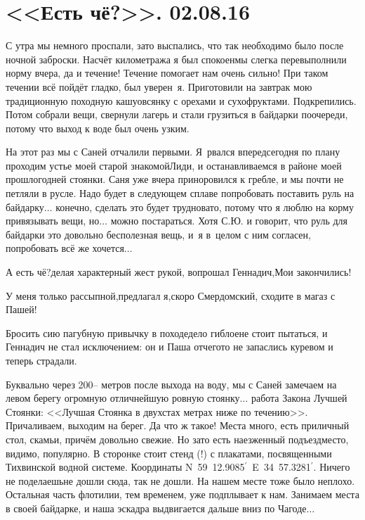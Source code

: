 \chapter{<<Есть чё?>>. 02.08.16} 

С утра мы немного проспали, зато выспались, что так необходимо было после ночной заброски. Насчёт километража я был спокоен\mdash мы слегка перевыполнили норму вчера, да и течение! Течение помогает нам очень сильно! При таком течении всё пойдёт гладко, был уверен~я. Приготовили на завтрак мою традиционную походную кашу\mdash овсянку с орехами и сухофруктами. Подкрепились. Потом собрали вещи, свернули лагерь и стали грузиться в байдарки по\sdash очереди, потому что выход к воде был очень узким. 

На этот раз мы с Саней отчалили первыми. Я~рвался вперед\mdash  сегодня по плану проходим устье моей старой знакомой\mdash  Лиди, и останавливаемся в районе моей прошлогодней стоянки. Саня уже вчера приноровился к гребле, и мы почти не петляли в русле. Надо будет в следующем сплаве попробовать поставить руль на байдарку$\ldots$ конечно, сделать это будет трудновато, потому что я люблю на корму привязывать вещи, но$\ldots$ можно постараться. Хотя С.Ю. и говорит, что руль для байдарки это довольно бесполезная вещь, и~я в~целом с ним согласен, попробовать всё же хочется$\ldots$ 

\diagdash А есть чё?\mdash делая характерный жест рукой, вопрошал Геннадич,\mdash Мои закончились!

\diagdash У меня только рассыпной,\mdash предлагал я,\mdash скоро Смердомский, сходите в магаз с Пашей!

Бросить сию пагубную привычку в походе\mdash дело гиблое\mdash не стоит пытаться, и Геннадич не стал исключением: он и Паша отчего\sdash то не запаслись куревом и теперь страдали.

Буквально через 200\thinspace\nobreakdash-- метров после выхода на воду, мы с Саней замечаем на левом берегу огромную отличнейшую ровную стоянку$\ldots$  работа Закона Лучшей Стоянки: <<Лучшая Стоянка в двухстах метрах ниже по течению>>. Причаливаем, выходим на берег. Да что ж такое! Места много, есть приличный стол, скамьи, причём довольно свежие. Но зато есть наезженный подъезд\mdash  место, видимо, популярно. В сторонке стоит стенд (!) с плакатами, посвященными Тихвинской водной системе. Координаты N~59\degree~12.9085$^\prime$~E~34\degrees~57.3281$^\prime$. Ничего не поделаешь\mdash  не дошли сюда, так не дошли. На нашем месте тоже было неплохо. Остальная часть флотилии, тем временем, уже подплывает к нам. Занимаем места в своей байдарке, и наша эскадра выдвигается дальше вниз по Чагоде$\ldots$  

